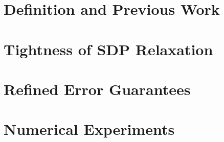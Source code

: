 \label{ch:ang_sync}
\section{Definition and Previous Work}


\section{Tightness of SDP Relaxation}
\label{sec:ang_sync_sdp}


\section{Refined Error Guarantees}
\label{sec:ang_sync_improve}


\section{Numerical Experiments}
\label{sec:ang_sync_num}

